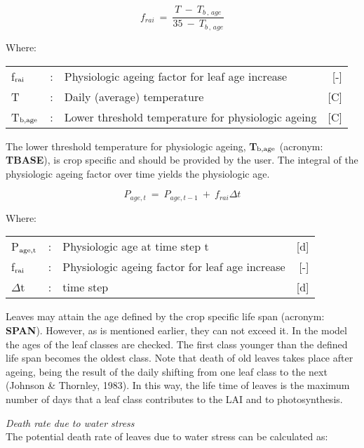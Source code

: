 \begin{equation}
f _{rai} ~=~{\frac{ T~-~T _{b\, ,\, age} }{35~-~ T _{b\, ,\, age} }}
\end{equation}

Where:\\[5pt]
\begin{tabularx}{\textwidth}{llXr}
	f$_{{\rm rai}}$ &:& Physiologic ageing factor for leaf age increase   &
	[-]\\
	T &:& Daily (average) temperature   &
	[\degrees C]\\
	T$_{{\rm b,age}}$ &:& Lower threshold temperature for physiologic ageing   &
	[\degrees C]\\
\end{tabularx}

The lower threshold temperature for physiologic ageing, {\bf T$_{{\rm b,age}}$} (acronym: {\bf TBASE}), is
crop specific and should be provided by the user. The integral of the physiologic ageing
factor over time yields the physiologic age. 

\begin{equation}
\label{eq:5.57}
P _{age,t} ~=~ P _{age,t-1} ~+~f_{rai} \Delta t
\end{equation}

Where:\\[5pt]
\begin{tabularx}{\textwidth}{llXr}
	P$_{{\rm age,t}}$ &:& Physiologic age at time step t & [d]\\
	f$_{{\rm rai}}$ &:& Physiologic ageing factor for leaf age increase & [-]\\
	$\Delta$t &:& time step & [d]\\
\end{tabularx}

Leaves may attain the age defined by the crop specific life span (acronym: {\bf SPAN}).
However, as is mentioned earlier, they can not exceed it. In the model the ages of the
leaf classes are checked. The first class younger than the defined life span becomes the
oldest class. Note that death of old leaves takes place after ageing, being the result of the
daily shifting from one leaf class to the next (Johnson \& Thornley, 1983). In this way,
the life time of leaves is the maximum number of days that a leaf class contributes to the
LAI and to photosynthesis.

{\it Death rate due to water stress}\\
The potential death rate of leaves due to water stress can be calculated as:

